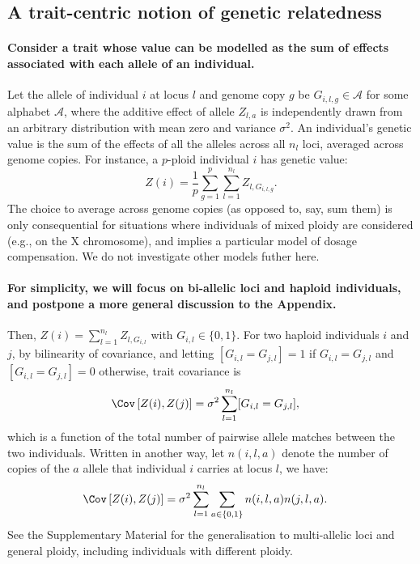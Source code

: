 
\subsection{A trait-centric notion of genetic relatedness}


\paragraph{Consider a trait whose value can be modelled as the
sum of effects associated with each allele of an individual.}
%
Let the allele of individual $i$ at locus $l$ and genome copy $g$ be
$G_{i,l,g} \in \mathcal{A}$ for some alphabet $\mathcal{A}$, where
the additive effect of allele $Z_{l,a}$
is independently drawn from an arbitrary distribution with mean zero and variance
$\sigma^2$.
An individual's genetic value is
the sum of the effects of all the alleles 
across all $n_l$ loci,
averaged across genome copies.
For instance, a $p$-ploid individual $i$ has genetic value:
$$
Z(i) = \frac{1}{p} \sum_{g=1}^p \sum_{l=1}^{n_l} Z_{l,G_{i,l,g}}.
$$
The choice to average across genome copies (as opposed to, say, sum them)
is only consequential for situations where individuals of mixed ploidy are considered
(e.g., on the X chromosome),
and implies a particular model of dosage compensation.
We do not investigate other models futher here.




\paragraph{For simplicity, we will focus on bi-allelic loci and haploid individuals,
and postpone a more general discussion to the Appendix.}
Then, $Z(i) = \sum_{l=1}^{n_l} Z_{l,G_{i,l}}$ with $G_{i,l} \in \{ 0, 1 \}$.
For two haploid individuals $i$ and $j$, by bilinearity of covariance,
and letting $[G_{i,l} = G_{j,l}] = 1$ if $G_{i,l} = G_{j,l}$ and
$[G_{i,l} = G_{j,l}] = 0$ otherwise,
trait covariance is
\begin{align} \label{eqn:trait_cov_non_centered}
    \Cov\left[Z(i), Z(j)\right] &= \sigma^2 \sum_{l=1}^{n_l} [G_{i,l} = G_{j,l}],
\end{align}
which is a function of the total number of pairwise allele matches
between the two individuals. 
%
Written in another way,
let $n(i,l,a)$ denote the number of copies of the $a$ allele that
individual $i$ carries at locus $l$, we have:
\begin{align} \label{eqn:trait_cov_non_centered2}
    \Cov\left[Z(i), Z(j)\right]
    &= \sigma^2 \sum_{l=1}^{n_l} \sum_{a \in \lbrace 0, 1 \rbrace} n(i,l,a) n(j,l,a).
\end{align}
%
See the Supplementary Material for the generalisation to multi-allelic
loci and general ploidy, including individuals with different ploidy.

